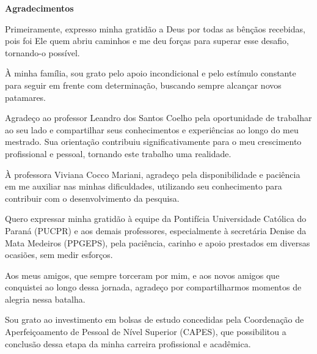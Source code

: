 \begin{center}
    \textbf{Agradecimentos}
\end{center}

Primeiramente, expresso minha gratidão a Deus por todas as bênçãos recebidas, pois foi Ele quem abriu caminhos e me deu forças para superar esse desafio, tornando-o possível.

À minha família, sou grato pelo apoio incondicional e pelo estímulo constante para seguir em frente com determinação, buscando sempre alcançar novos patamares.

Agradeço ao professor Leandro dos Santos Coelho pela oportunidade de trabalhar ao seu lado e compartilhar seus conhecimentos e experiências ao longo do meu mestrado. Sua orientação contribuiu significativamente para o meu crescimento profissional e pessoal, tornando este trabalho uma realidade.

À professora Viviana Cocco Mariani, agradeço pela disponibilidade e paciência em me auxiliar nas minhas dificuldades, utilizando seu conhecimento para contribuir com o desenvolvimento da pesquisa.

Quero expressar minha gratidão à equipe da Pontifícia Universidade Católica do Paraná (PUCPR) e aos demais professores, especialmente à secretária Denise da Mata Medeiros (PPGEPS), pela paciência, carinho e apoio prestados em diversas ocasiões, sem medir esforços.

Aos meus amigos, que sempre torceram por mim, e aos novos amigos que conquistei ao longo dessa jornada, agradeço por compartilharmos momentos de alegria nessa batalha.

Sou grato ao investimento em bolsas de estudo concedidas pela Coordenação de Aperfeiçoamento de Pessoal de Nível Superior (CAPES), que possibilitou a conclusão dessa etapa da minha carreira profissional e acadêmica.

